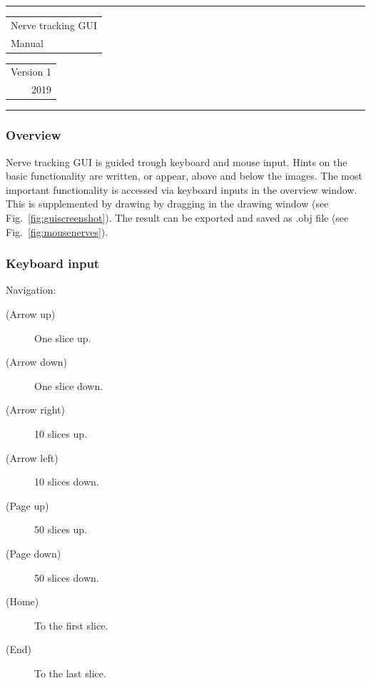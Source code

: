 \documentclass[paper=a4, fontsize=10pt]{article}
\begin{document}
	\begin{Large}\hrule height 1pt
		\begin{tabular}{@{}l@{}} Nerve tracking GUI \\ Manual\end{tabular}
		\begin{tabular}{@{}r@{}} Version 1 \\ 2019\end{tabular}\hrule	
	\end{Large}\par\vspace{\baselineskip}
	
\subsubsection*{Overview}
Nerve tracking GUI is guided trough keyboard and mouse input. Hints on the basic functionality are written, or appear, above and below the images. The most important functionality is accessed via keyboard inputs in the overview window. This is supplemented by drawing by dragging in the drawing window (see Fig.~\ref{fig:guiscreenshot}). The result can be exported and saved as .obj file (see Fig.~\ref{fig:mousenerves}).


\subsubsection*{Keyboard input}
Navigation:
\begin{description}
		\item[(Arrow up)] One slice up.
		\item[(Arrow down)] One slice down.
		\item[(Arrow right)] 10 slices up.
		\item[(Arrow left)] 10 slices down.
		\item[(Page up)] 50 slices up.
		\item[(Page down)] 50 slices down.
		\item[(Home)] To the first slice.
		\item[(End)] To the last slice.
\end{description}
\end{document}
